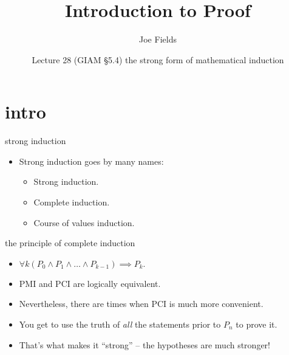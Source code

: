 \documentclass[handout,landscape]{beamer}
\author{Joe Fields}
\title{Introduction to Proof}
\date{Lecture 28 (GIAM \S 5.4) \newline the strong form of mathematical induction}
\institute[SCSU]{ {\tt fieldsj1@southernct.edu} }
\begin{document}
\begin{frame}[plain]
  \titlepage
\end{frame}

\section{intro}

\begin{frame}{strong induction}
\begin{itemize}
\item Strong induction goes by many names: \pause
\begin{itemize}
\item Strong induction. \pause
\item Complete induction. \pause
\item Course of values induction. \pause
\end{itemize}
\end{itemize}
\end{frame}


\begin{frame}{the principle of complete induction}
\begin{itemize}
\item $ \displaystyle \forall k (P_0 \land P_1 \land \ldots \land  P_{k-1}) \implies P_k.$
\item PMI and PCI are logically equivalent. \pause
\item Nevertheless, there are times when PCI is much more convenient. \pause
\item You get to use the truth of {\em all} the statements prior to $P_n$ to prove it. \pause
\item That's what makes it ``strong'' -- the hypotheses are much stronger!
\end{itemize}
\end{frame}
\end{document}
